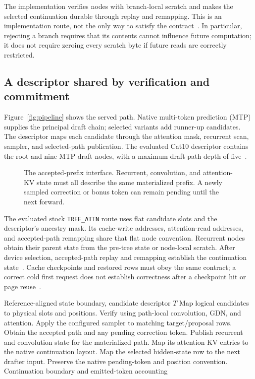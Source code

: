 \documentclass[conference]{IEEEtran}
\begin{document}
The implementation verifies nodes with branch-local scratch and makes the selected continuation durable through replay and remapping. This is an implementation route, not the only way to satisfy the contract~\cite{lumo2026archive,lumo2026stateless}. In particular, rejecting a branch requires that its contents cannot influence future computation; it does not require zeroing every scratch byte if future reads are correctly restricted.

\subsection{A descriptor shared by verification and commitment}
Figure~\ref{fig:pipeline} shows the served path. Native multi-token prediction (MTP) supplies the principal draft chain; selected variants add runner-up candidates. The descriptor maps each candidate through the attention mask, recurrent scan, sampler, and selected-path publication. The evaluated Cat10 descriptor contains the root and nine MTP draft nodes, with a maximum draft-path depth of five~\cite{lumo2026archive}.

\begin{figure}[t]
\centering

\caption{The accepted-prefix interface. Recurrent, convolution, and attention-KV state must all describe the same materialized prefix. A newly sampled correction or bonus token can remain pending until the next forward.}
\label{fig:contract}
\end{figure}

The evaluated stock \texttt{TREE\_ATTN} route uses flat candidate slots and the descriptor's ancestry mask. Its cache-write addresses, attention-read addresses, and accepted-path remapping share that flat node convention. Recurrent nodes obtain their parent state from the pre-tree state or node-local scratch. After device selection, accepted-path replay and remapping establish the continuation state~\cite{lumo2026archive}. Cache checkpoints and restored rows must obey the same contract; a correct cold first request does not establish correctness after a checkpoint hit or page reuse~\cite{lumo2026stateless}.

\begin{algorithm}[t]
\caption{Logical verifier and continuation boundary}
\label{alg:verify}
\begin{algorithmic}[1]
\REQUIRE Reference-aligned state boundary, candidate descriptor $T$
\STATE Map logical candidates to physical slots and positions.
\STATE Verify using path-local convolution, GDN, and attention.
\STATE Apply the configured sampler to matching target/proposal rows.
\STATE Obtain the accepted path and any pending correction token.
\STATE Publish recurrent and convolution state for the materialized path.
\STATE Map its attention KV entries to the native continuation layout.
\STATE Map the selected hidden-state row to the next drafter input.
\STATE Preserve the native pending-token and position convention.
\RETURN Continuation boundary and emitted-token accounting
\end{algorithmic}
\end{algorithm}
\end{document}
